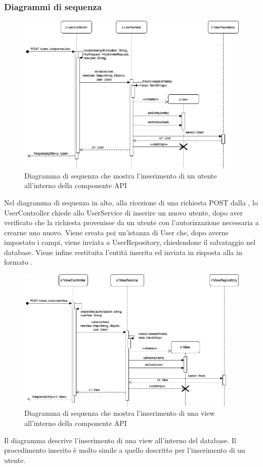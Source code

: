 \begin{landscape}
	\subsubsection{Diagrammi di sequenza}%
		\begin{figure}[H]
			\centering
			\includegraphics[scale=0.600]{res/images/API/inserimento_utente.png}
			\caption{Diagramma di sequenza che mostra l'inserimento di un utente all'interno della componente API}
			\label{Diagramma 17}
		\end{figure}
		Nel diagramma di sequenza in alto, alla ricezione di una richiesta POST dalla , lo UserController chiede allo UserService di inserire un nuovo utente, dopo aver verificato che la richiesta provenisse da un utente con l'autorizzazione necessaria a crearne uno nuovo.
		\newline
		Viene creata poi un'istanza di User che, dopo averne impostato i campi, viene inviata a UserRepository, chiedendone il salvataggio nel database. Viene infine restituita l'entità inserita ed inviata in risposta alla  in formato .
		\begin{figure}[H]
			\centering
			\includegraphics[scale=0.600]{res/images/API/inserimento_view.png}
			\caption{Diagramma di sequenza che mostra l'inserimento di una view all'interno della componente API}
			\label{Diagramma 18}
		\end{figure}
		Il diagramma descrive l'inserimento di una view all'interno del database. Il procedimento inserito è molto simile a quello descritto per l'inserimento di un utente.
	\end{landscape}
	

